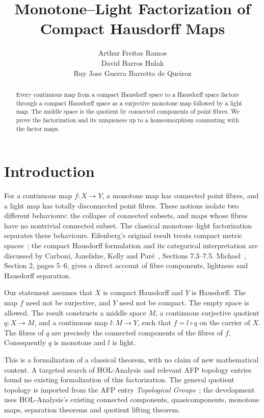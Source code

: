 \documentclass[11pt,a4paper]{article}
\begin{document}
\title{Monotone--Light Factorization of Compact Hausdorff Maps}
\author{Arthur Freitas Ramos \\ David Barros Hulak \\
Ruy Jose Guerra Barretto de Queiroz}
\maketitle
\begin{abstract}
Every continuous map from a compact Hausdorff space to a Hausdorff space
factors through a compact Hausdorff space as a surjective monotone map
followed by a light map. The middle space is the quotient by connected
components of point fibres. We prove the factorization and its uniqueness
up to a homeomorphism commuting with the factor maps.
\end{abstract}
\tableofcontents
\section{Introduction}
For a continuous map $f:X\to Y$, a monotone map has connected point fibres,
and a light map has totally disconnected point fibres. These notions isolate
two different behaviours: the collapse of connected subsets, and maps whose
fibres have no nontrivial connected subset. The classical monotone--light
factorization separates these behaviours. Eilenberg's original result treats
compact metric spaces~\cite{Eilenberg1934}; the compact Hausdorff formulation
and its categorical interpretation are discussed by
Carboni, Janelidze, Kelly and Par\'e~\cite{Carboni1997}, Sections 7.3--7.5.
Michael~\cite{Michael1964}, Section 2, pages 5--6, gives a direct account
of fibre components, lightness and Hausdorff separation.

Our statement assumes that $X$ is compact Hausdorff and $Y$ is Hausdorff.
The map $f$ need not be surjective, and $Y$ need not be compact. The empty
space is allowed. The result constructs a middle space $M$, a continuous
surjective quotient $q:X\to M$, and a continuous map $l:M\to Y$, such that
$f=l\circ q$ on the carrier of $X$. The fibres of $q$ are precisely the
connected components of the fibres of $f$. Consequently $q$ is monotone
and $l$ is light.

This is a formalization of a classical theorem, with no claim of new
mathematical content. A targeted search of HOL-Analysis and relevant AFP
topology entries found no existing formalization of this factorization.
The general quotient topology is imported from the AFP entry
\emph{Topological Groups}~\cite{TopologicalGroups}; the development uses
HOL-Analysis's existing connected components, quasicomponents, monotone
maps, separation theorems and quotient lifting theorem.
\end{document}
